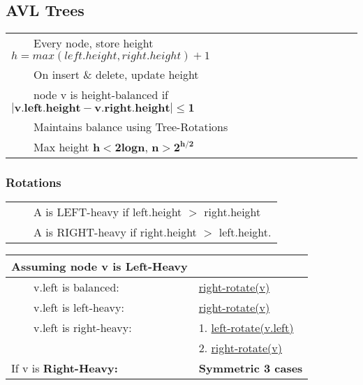 \documentclass{article}
\newcommand{\tabitem}{~~\llap{\textbullet}~~}
\begin{document}
    \pagebreak

    \subsection{AVL Trees}

    \begin{tabular}{l}
        \tabitem Every node, store height $h = max(left.height, right.height) + 1$ \\
        \tabitem On insert \& delete, update height\\
        \tabitem node v is height-balanced if $\bm{|v.left.height - v.right.height| \leq 1}$\\
        \tabitem Maintains balance using Tree-Rotations\\
        \tabitem Max height $\bm{h < 2logn}$, $\bm{n > 2^{h/2}}$
    \end{tabular}

    \subsubsection{Rotations}

    \begin{tabular}{l}
        \tabitem A is LEFT-heavy if left.height $>$ right.height\\
        \tabitem A is RIGHT-heavy if right.height $>$ left.height.\\
    \end{tabular}

    \bigskip

    \noindent\begin{tabular}{ll}
        \toprule
        \textbf{Assuming node v is Left-Heavy}\\
        \hline
        \hline
        \tabitem v.left is balanced: & \hyperref[rightrot]{right-rotate(v)}\\
        \hline
        \tabitem v.left is left-heavy: & \hyperref[rightrot2]{right-rotate(v)}\\
        \hline
        \tabitem v.left is right-heavy: & 1. \hyperref[case31]{left-rotate(v.left)}\\
        & 2. \hyperref[case32]{right-rotate(v)}\\
        \bottomrule
        If v is \textbf{Right-Heavy: } & \textbf{Symmetric 3 cases}\\
        \bottomrule
    \end{tabular}

    \bigskip
\end{document}
